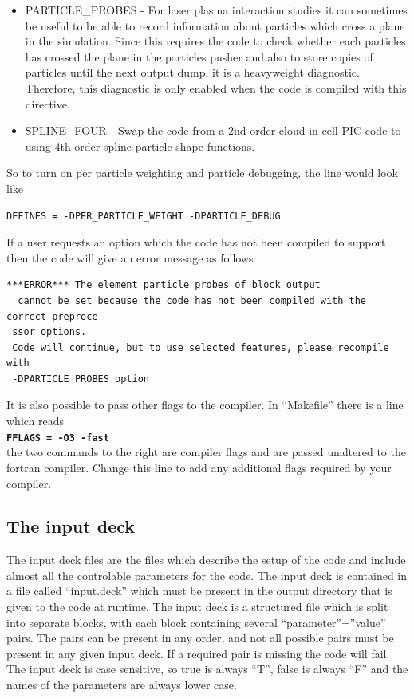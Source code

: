 \documentclass[12pt,a4paper]{article}
\newcommand{\simpleboxverbatim}{\begin{Verbatim}[obeytabs=true,frame=single,
  framerule=0.5mm,rulecolor=\color{warwickmid},formatcom=\color{black}]}
\newcommand{\inlinecode}[1]{{\color{warwickred} \bf\texttt{#1}}}
\newcommand{\EPOCH}{{\color{warwickdark}\fontfamily{phv}\selectfont{EPOCH}}}
\begin{document}
\begin{itemize}
  tracer particles. Tracer particles are specified like normal particles, and
  move about as would a normal particle with the same charge and mass, but
  tracer particles do not generate any current and are therefore passive
  elements in the simulation. Any attempt to add particle collision effects
  should remember that tracer species should not interact through collisions.
\item PARTICLE\_PROBES - For laser plasma interaction studies it can sometimes
  be useful to be able to record information about particles which cross a
  plane in the simulation. Since this requires the code to check whether each
  particles has crossed the plane in the particles pusher and also to store
  copies of particles until the next output dump, it is a heavyweight
  diagnostic. Therefore, this diagnostic is only enabled when the code is
  compiled with this directive.
\item SPLINE\_FOUR - Swap the code from a 2nd order cloud in cell PIC code to
  using 4th order spline particle shape functions.
\end{itemize}

So to turn on per particle weighting and particle debugging, the line would
look like\\
\simpleboxverbatim
DEFINES = -DPER_PARTICLE_WEIGHT -DPARTICLE_DEBUG
\end{Verbatim}

If a user requests an option which the code has not been compiled to support
then the code will give an error message as follows
\simpleboxverbatim
 ***ERROR*** The element particle_probes of block output
  cannot be set because the code has not been compiled with the correct preproce
 ssor options.
 Code will continue, but to use selected features, please recompile with
 -DPARTICLE_PROBES option
\end{Verbatim}

It is also possible to pass other flags to the compiler. In ``Makefile'' there is
a line which reads\\
\inlinecode{FFLAGS = -O3 -fast}\\
the two commands to the right are compiler flags and are passed unaltered to
the fortran compiler. Change this line to add any additional flags required by
your compiler.

\subsection{The {\EPOCH} input deck}
The input deck files are the files which describe the setup of the code and
include almost all the controlable parameters for the code. The input deck is
contained in a file called ``input.deck'' which must be present in the output
directory that is given to the code at runtime. The input deck is a structured
file which is split into separate blocks, with each block containing several
``parameter''=''value'' pairs. The pairs can be present in any order, and not
all possible pairs must be present in any given input deck. If a required pair
is missing the code will fail. The input deck is case sensitive, so true is
always ``T'', false is always ``F'' and the names of the parameters are always
lower case.\\
\end{document}
